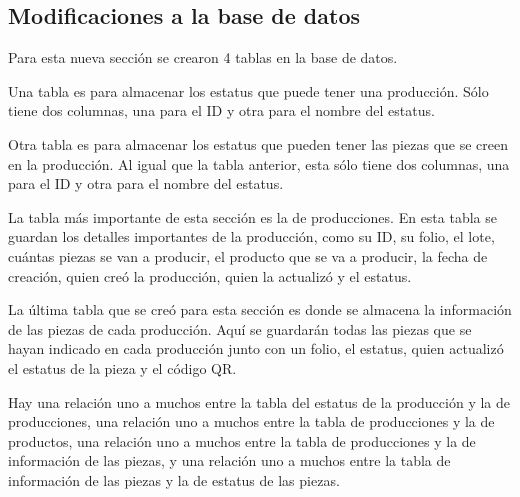 \subsection{Modificaciones a la base de datos}
Para esta nueva sección se crearon 4 tablas en la base de datos.

Una tabla es para almacenar los estatus que puede tener una producción. Sólo tiene dos columnas, una para el ID y otra para el nombre del estatus.

Otra tabla es para almacenar los estatus que pueden tener las piezas que se creen en la producción. Al igual que la tabla anterior, esta sólo tiene dos columnas, una para el ID y otra para el nombre del estatus.

La tabla más importante de esta sección es la de producciones. En esta tabla se guardan los detalles importantes de la producción, como su ID, su folio, el lote, cuántas piezas se van a producir, el producto que se va a producir, la fecha de creación, quien creó la producción, quien la actualizó y el estatus.

La última tabla que se creó para esta sección es donde se almacena la información de las piezas de cada producción. Aquí se guardarán todas las piezas que se hayan indicado en cada producción junto con un folio, el estatus, quien actualizó el estatus de la pieza y el código QR.\@

Hay una relación uno a muchos entre la tabla del estatus de la producción y la de producciones, una relación uno a muchos entre la tabla de producciones y la de productos, una relación uno a muchos entre la tabla de producciones y la de información de las piezas, y una relación uno a muchos entre la tabla de información de las piezas y la de estatus de las piezas.
